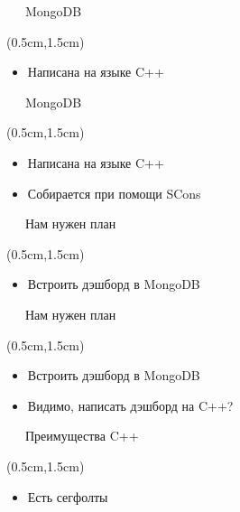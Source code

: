 \documentclass[xetex,18pt,aspectratio=43]{beamer}
\begin{document}
\begin{Large}
\begin{frame}{\ \ \ MongoDB}
\begin{textblock*}{\framewidth-0.8cm}(0.5cm,1.5cm)
\begin{itemize}
  \item Написана на языке C++
\end{itemize}
\end{textblock*}
\end{frame}

\begin{frame}{\ \ \ MongoDB}
\begin{textblock*}{\framewidth-0.8cm}(0.5cm,1.5cm)
\begin{itemize}
  \item Написана на языке C++
  \item Собирается при помощи SCons
\end{itemize}
\end{textblock*}
\end{frame}

\begin{frame}{\ \ \ Нам нужен план}
\begin{textblock*}{\framewidth-0.8cm}(0.5cm,1.5cm)
\begin{itemize}
  \item Встроить дэшборд в MongoDB
\end{itemize}
\end{textblock*}
\end{frame}

\begin{frame}{\ \ \ Нам нужен план}
\begin{textblock*}{\framewidth-0.8cm}(0.5cm,1.5cm)
\begin{itemize}
  \item Встроить дэшборд в MongoDB
  \item Видимо, написать дэшборд на C++?
\end{itemize}
\end{textblock*}
\end{frame}

\begin{frame}{\ \ \ Преимущества C++}
\begin{textblock*}{\framewidth-0.8cm}(0.5cm,1.5cm)
\begin{itemize}
  \item Есть сегфолты
\end{itemize}
\end{textblock*}
\end{frame}


\end{Large}
\end{document}
